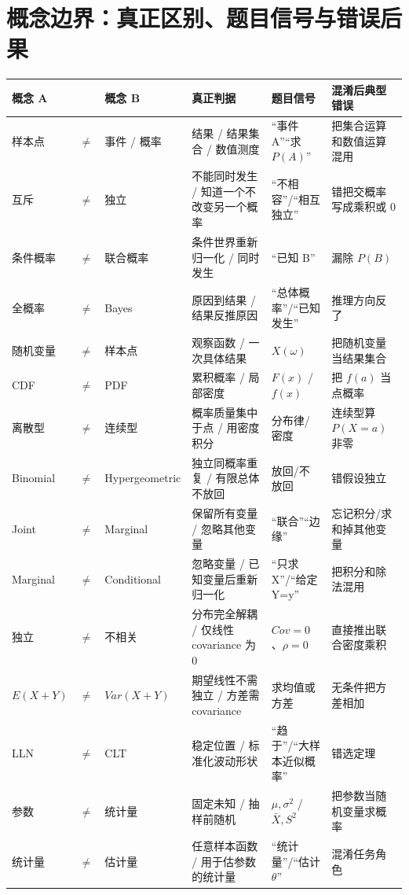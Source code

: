 \documentclass[11pt,a4paper,openany]{ctexbook}
\begin{document}
\chapter{概念边界：真正区别、题目信号与错误后果}

\begin{longtable}{L{1.7cm}@{}>{\centering\arraybackslash}p{0.35cm}@{}L{1.7cm}L{3.3cm}L{3.3cm}L{\dimexpr\linewidth-10.72cm\relax}}
\toprule
\textbf{概念 A} & & \textbf{概念 B} & \textbf{真正判据} & \textbf{题目信号} & \textbf{混淆后典型错误}\\
\midrule
样本点 & $\neq$ & 事件 / 概率 & 结果 / 结果集合 / 数值测度 & “事件 A”“求 $P(A)$” & 把集合运算和数值运算混用\\
互斥 & $\neq$ & 独立 & 不能同时发生 / 知道一个不改变另一个概率 & “不相容”/“相互独立” & 错把交概率写成乘积或 0\\
条件概率 & $\neq$ & 联合概率 & 条件世界重新归一化 / 同时发生 & “已知 B” & 漏除 $P(B)$\\
全概率 & $\neq$ & Bayes & 原因到结果 / 结果反推原因 & “总体概率”/“已知发生” & 推理方向反了\\
随机变量 & $\neq$ & 样本点 & 观察函数 / 一次具体结果 & $X(\omega)$ & 把随机变量当结果集合\\
CDF & $\neq$ & PDF & 累积概率 / 局部密度 & $F(x)$ / $f(x)$ & 把 $f(a)$ 当点概率\\
离散型 & $\neq$ & 连续型 & 概率质量集中于点 / 用密度积分 & 分布律/密度 & 连续型算 $P(X=a)$ 非零\\
Binomial & $\neq$ & Hypergeometric & 独立同概率重复 / 有限总体不放回 & 放回/不放回 & 错假设独立\\
Joint & $\neq$ & Marginal & 保留所有变量 / 忽略其他变量 & “联合”“边缘” & 忘记积分/求和掉其他变量\\
Marginal & $\neq$ & Conditional & 忽略变量 / 已知变量后重新归一化 & “只求 X”/“给定 Y=y” & 把积分和除法混用\\
独立 & $\neq$ & 不相关 & 分布完全解耦 / 仅线性 covariance 为 0 & $Cov=0$、$\rho=0$ & 直接推出联合密度乘积\\
$E(X+Y)$ & $\neq$ & $Var(X+Y)$ & 期望线性不需独立 / 方差需 covariance & 求均值或方差 & 无条件把方差相加\\
LLN & $\neq$ & CLT & 稳定位置 / 标准化波动形状 & “趋于”/“大样本近似概率” & 错选定理\\
参数 & $\neq$ & 统计量 & 固定未知 / 抽样前随机 & $\mu,\sigma^2$ / $\bar X,S^2$ & 把参数当随机变量求概率\\
统计量 & $\neq$ & 估计量 & 任意样本函数 / 用于估参数的统计量 & “统计量”/“估计 $\theta$” & 混淆任务角色\\

\end{longtable}
\end{document}
